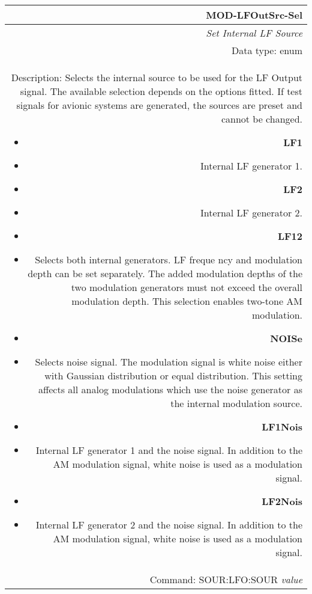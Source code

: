 \documentclass[openany]{article}
\begin{document}
		\begin{tabular}{N}
			\hline
			\bfseries MOD-LFOutSrc-Sel \\ \hline
			\emph{Set Internal LF Source} \\
			Data type: enum \\  
			Description: Selects the internal source to be used for the LF Output signal. The available selection depends on the options fitted. If test signals for avionic systems are generated, the sources are preset and cannot be changed. \begin{itemize}[noitemsep]
				\small
                                \item[] \textbf{LF1}
                                \item[] Internal LF generator 1.
                                \item[] \textbf{LF2}
                                \item[] Internal LF generator 2.
                                \item[] \textbf{LF12}
                                \item[] Selects both internal generators. LF freque     ncy and modulation depth can be set separately. The added modulation depths of the two modulation generators must not exceed the overall modulation depth. This selection enables two-tone AM modulation.
                                \item[] \textbf{NOISe}
                                \item[] Selects noise signal. The modulation signal      is white noise either with Gaussian distribution or equal distribution. This setting affects all analog modulations which use the noise generator as the internal modulation source.
                                \item[] \textbf{LF1Nois}
                                \item[] Internal LF generator 1 and the noise signal. In addition to the AM modulation signal, white noise is used as a modulation signal.
                                \item[] \textbf{LF2Nois}
                                \item[] Internal LF generator 2 and the noise signal. In addition to the AM modulation signal, white noise is used as a modulation signal.
			\end{itemize} \\
			Command: SOUR:LFO:SOUR \emph{value} \\

		\end{tabular}
\end{document}

